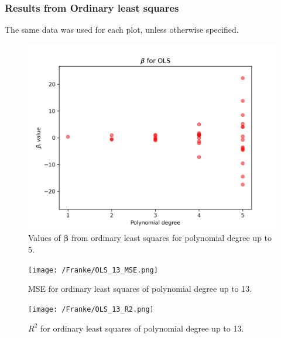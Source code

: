 \documentclass{article}
\begin{document}
\newpage
\subsubsection{Results from Ordinary least squares}
The same data was used for each plot, unless otherwise specified.
\begin{figure}[htbp]
    \centering
    \includegraphics[width=\textwidth*2/3]{Franke/OLS_5_betas.png}
    \caption{Values of $\boldsymbol{\beta}$ from ordinary least squares for polynomial degree up to 5.}
    \label{fig:OLS5Beta}
\end{figure}

\begin{figure}[htbp]
    \centering
    \texttt{[image: /Franke/OLS\_13\_MSE.png]}
    \caption{MSE for ordinary least squares of polynomial degree up to 13.}
    \label{fig:OLS5MSE}
\end{figure}

\begin{figure}[htbp]
    \centering
    \texttt{[image: /Franke/OLS\_13\_R2.png]}
    \caption{$R^2$ for ordinary least squares of polynomial degree up to 13.}
    \label{fig:OLS5R2}
\end{figure}
\end{document}
